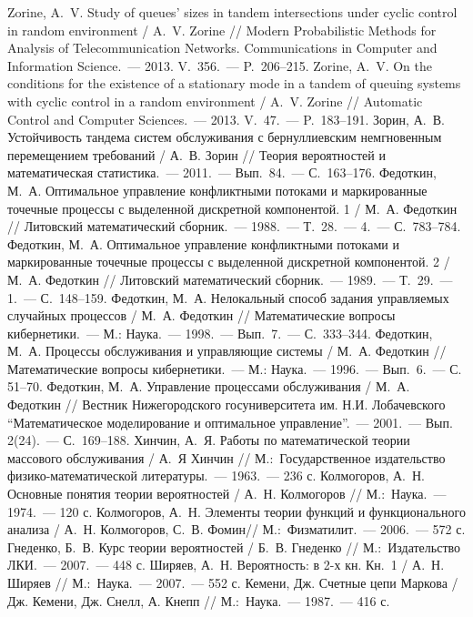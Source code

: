 \documentclass[a4paper,12pt,russian]{extarticle}
\newcommand{\No}{\textnumero}
\begin{document}
\begin{thebibliography}{99}
 Zorine, A.~V. Study of queues’ sizes in tandem intersections under cyclic control in random environment /  A.~V. Zorine // Modern Probabilistic Methods for Analysis of Telecommunication Networks. Communications in Computer and Information Science.~--- 2013. V.~356.~--- P.~206--215.
 Zorine, A.~V. On the conditions for the existence of a stationary mode in a tandem of queuing systems with cyclic control in a random environment / A.~V. Zorine // Automatic Control and Computer Sciences.~--- 2013. V.~47.~--- P.~183--191.
 Зорин, А.~В. Устойчивость тандема систем обслуживания с бернуллиевским немгновенным перемещением требований / А.~В. Зорин // Теория вероятностей и математическая статистика.~--- 2011.~--- Вып.~84.~--- С.~163--176.
 Федоткин, М.~А. Оптимальное управление конфликтными потоками и маркированные точечные процессы с выделенной дискретной компонентой. 1 / М.~А. Федоткин // Литовский математический сборник.~--- 1988.~--- Т.~28.~--- \No {} 4.~--- С.~783--784.
 Федоткин, М.~А. Оптимальное управление конфликтными потоками и маркированные точечные процессы с выделенной дискретной компонентой. 2 / М.~А. Федоткин // Литовский математический сборник.~--- 1989.~--- Т.~29.~--- \No {} 1.~--- С.~148--159.
 Федоткин, М.~А. Нелокальный способ задания управляемых случайных процессов / М.~А. Федоткин // Математические вопросы кибернетики.~--- М.: Наука.~--- 1998.~--- Вып.~7.~--- С.~333--344.
 Федоткин, М.~А. Процессы обслуживания и управляющие системы / М.~А. Федоткин // Математические вопросы кибернетики.~--- М.: Наука.~--- 1996.~--- Вып.~6.~--- С. 51--70.
 Федоткин, М.~А. Управление процессами обслуживания / М.~А. Федоткин // Вестник Нижегородского госуниверситета им. Н.И. Лобачевского “Математическое моделирование и оптимальное управление”.~--- 2001.~--- Вып. 2(24).~--- С.~169--188.
 Хинчин, А.~Я. Работы по математической теории массового обслуживания / А.~Я Хинчин // М.:~Государственное издательство физико-математической литературы.~--- 1963.~--- 236 с.
 Колмогоров, А.~Н. Основные понятия теории вероятностей / А.~Н. Колмогоров // М.:~Наука.~--- 1974.~--- 120 с.
 Колмогоров, А.~Н. Элементы теории функций и функционального анализа / А.~Н. Колмогоров, С.~В. Фомин// М.:~Физматилит.~--- 2006.~--- 572 с.
 Гнеденко, Б.~В. Курс теории вероятностей / Б.~В. Гнеденко // М.:~Издательство ЛКИ.~--- 2007.~--- 448 с.
 Ширяев, А.~Н. Вероятность: в 2-х кн. Кн.~1 / А.~Н. Ширяев // М.:~Наука.~--- 2007.~--- 552 с.
 Кемени, Дж. Счетные цепи Маркова / Дж. Кемени, Дж. Снелл, А. Кнепп // М.:~Наука.~--- 1987.~--- 416 с.
\end{thebibliography}
\end{document}
